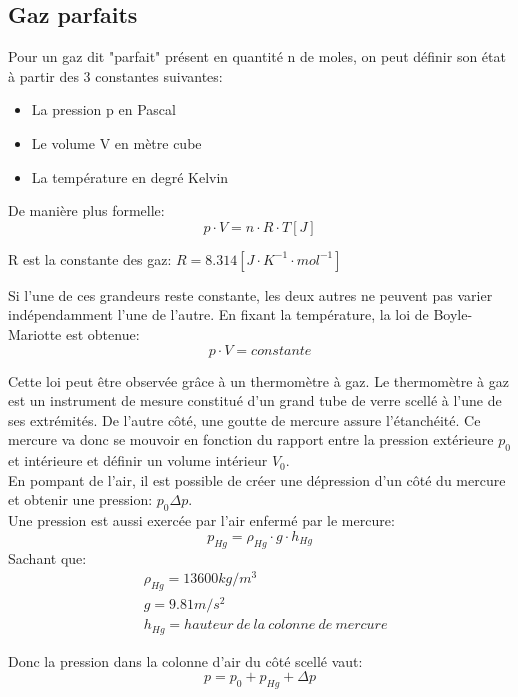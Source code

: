 \subsection{Gaz parfaits}
Pour un gaz dit "parfait" présent en quantité n de moles, on peut définir son état à partir des 3 constantes suivantes:
\begin{itemize}
    \item{La pression p en Pascal}
    \item{Le volume V en mètre cube}
    \item{La température en degré Kelvin}
\end{itemize}

De manière plus formelle:
\begin{equation}
    p \cdot V = n\cdot R \cdot T [J]
\end{equation}

R est la constante des gaz: $R=8.314 [J\cdot K^{-1} \cdot mol^{-1}]$

Si l'une de ces grandeurs reste constante, les deux autres ne peuvent pas varier indépendamment l'une de l'autre. En fixant la température, la loi de Boyle-Mariotte est obtenue:
\begin{equation}
    \label{boylemariotte}
    p\cdot V = constante
\end{equation}

Cette loi peut être observée grâce à un thermomètre à gaz.
Le thermomètre à gaz est un instrument de mesure constitué d'un grand tube de verre scellé à l'une de ses extrémités. De l'autre côté, une goutte de mercure assure l'étanchéité. Ce mercure va donc se mouvoir en fonction du rapport entre la pression extérieure $p_0$ et intérieure et définir un volume intérieur $V_0$.\\
En pompant de l'air, il est possible de créer une dépression d'un côté du mercure et obtenir une pression: $p_0 \Delta p$.\\
Une pression est aussi exercée par l'air enfermé par le mercure:
\begin{equation}
    p_{Hg} = \rho_{Hg}\cdot g \cdot h_{Hg}
\end{equation}
Sachant que:
\begin{align*}
    &\rho_{Hg} = 13600 kg/m^3\\
    &g = 9.81 m/s^2\\
    &h_{Hg} = hauteur\ de\ la\ colonne\ de\ mercure
\end{align*}

Donc la pression dans la colonne d'air du côté scellé vaut:
\begin{equation}
    p = p_0 + p_{Hg} + \Delta p
\end{equation}

